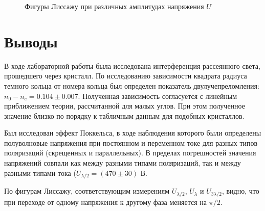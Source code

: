 \documentclass[a4paper,12pt]{article}
\begin{document}
\begin{enumerate}
\begin{figure}[h]
\begin{minipage}[h]{0.3\linewidth}
		\end{minipage}
		\caption{Фигуры Лиссажу при различных амплитудах напряжения $U$}
		\label{lis}
\end{figure}

\end{enumerate}

\section{Выводы}

В ходе лабораторной работы была исследована интерференция рассеянного света, прошедшего через кристалл. По исследованию зависимости квадрата радиуса темного кольца от номера кольца был определен показатель двулучепреломления: $n_0 - n_e = 0.104 \pm 0.007$. Полученная зависимость согласуется с линейным приближением теории, рассчитанной для малых углов. При этом полученное значение близко по порядку к табличным данным для подобных кристаллов.
\par
Был исследован эффект Поккельса, в ходе наблюдения которого были определены полуволновые напряжения при постоянном и переменном токе для разных типов поляризаций (скрещенных и параллельных). В пределах погрешностей значения напряжений совпали как между разными типами поляризаций, так и между разными типами тока ($U_{\lambda/2}=(470 \pm 30)$ В.
\par
По фигурам Лиссажу, соответствующим измерениям $U_{\lambda/2}$, $U_{\lambda}$ и $U_{3\lambda/2}$, видно, что при переходе от одному напряжения к другому фаза меняется на $\pi/2$.
\end{document}
